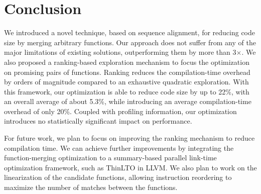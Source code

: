 \vspace{-2ex}
\section{Conclusion}

We introduced a novel technique, based on sequence alignment, for reducing
code size by merging arbitrary functions. Our approach does not suffer from
any of the major limitations of existing solutions, outperforming them by more
than 3$\times$. We also proposed a ranking-based
exploration mechanism to focus the optimization on promising pairs of
functions. Ranking reduces the compilation-time overhead by orders of magnitude
compared to an exhaustive quadratic exploration. With this framework, our
optimization is able to reduce code size by up to 22\%, with an overall average
of about 5.3\%, while introducing an average compilation-time overhead of only 20\%.
Coupled with profiling information, our optimization introduces no statistically
significant impact on performance.

For future work, we plan to focus on improving the ranking mechanism to reduce
compilation time.
We can achieve further improvements by integrating the
function-merging optimization to a summary-based parallel link-time optimization
framework, such as ThinLTO in LLVM.
We also plan to work on the linearization of the candidate functions, allowing
instruction reordering to maximize the number of matches between the functions.
